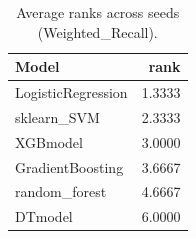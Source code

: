 \begin{table}[t]
\centering
\begin{tabular}{lr}
\toprule
Model & rank \\
\midrule
LogisticRegression & 1.3333 \\
sklearn_SVM & 2.3333 \\
XGBmodel & 3.0000 \\
GradientBoosting & 3.6667 \\
random_forest & 4.6667 \\
DTmodel & 6.0000 \\
\bottomrule
\end{tabular}
\caption{Average ranks across seeds (Weighted_Recall).}
\label{tab:avg_rank_Weighted_Recall}
\end{table}
